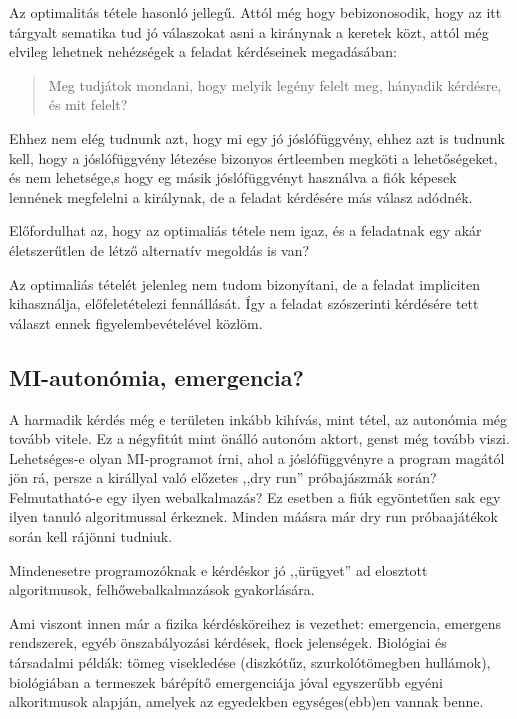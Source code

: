 \documentclass{article}
\begin{document}
	Az optimalitás tétele hasonló jellegű. Attól még hogy bebizonosodik, hogy az itt tárgyalt sematika tud jó válaszokat asni a kiránynak a keretek közt, attól még elvileg lehetnek nehézségek a feladat kérdéseinek megadásában:

	\begin{quotation}
		Meg tudjátok mondani, hogy melyik legény felelt meg, hányadik kérdésre, és mit felelt?
	\end{quotation}

	Ehhez nem elég tudnunk azt, hogy mi egy jó jóslófüggvény, ehhez azt is tudnunk kell, hogy a jóslófüggvény létezése bizonyos értleemben megköti a lehetőségeket, és nem lehetsége,s hogy eg másik jóslófüggvényt használva a fiók képesek lennének megfelelni a királynak, de a feladat kérdésére más válasz adódnék.

	Előfordulhat az, hogy az optimaliás tétele nem igaz, és a feladatnak egy akár életszerűtlen de létző alternatív megoldás is van?

	Az optimaliás tételét jelenleg nem tudom bizonyítani, de a feladat impliciten kihasználja, előfeletételezi fennállását. Így a feladat szószerinti kérdésére tett választ ennek figyelembevételével közlöm.

	\subsection{MI-autonómia, emergencia?}

	A harmadik kérdés még e területen inkább kihívás, mint tétel, az autonómia még tovább vitele. Ez a négyfitút mint önálló autonóm aktort, genst még tovább viszi. Lehetséges-e olyan MI-programot írni, ahol a jóslófüggvényre a program magától jön rá, persze a királlyal való előzetes ,,dry run'' próbajászmák során? Felmutatható-e egy ilyen webalkalmazás? Ez esetben a fiúk egyöntetűen sak egy ilyen tanuló algoritmussal érkeznek. Minden máásra már dry run próbaajátékok során kell rájönni tudniuk.

	Mindenesetre programozóknak e kérdéskor jó ,,ürügyet'' ad elosztott algoritmusok, felhőwebalkalmazások gyakorlására.

	Ami viszont innen már a fizika kérdésköreihez is vezethet: emergencia, emergens rendszerek, egyéb önszabályozási kérdések, flock jelenségek. Biológiai és társadalmi példák: tömeg visekledése (diszkótűz, szurkolótömegben hullámok), biológiában a termeszek bárépítő emergenciája jóval egyszerűbb egyéni alkoritmusok alapján, amelyek az egyedekben egységes(ebb)en vannak benne.
\end{document}
